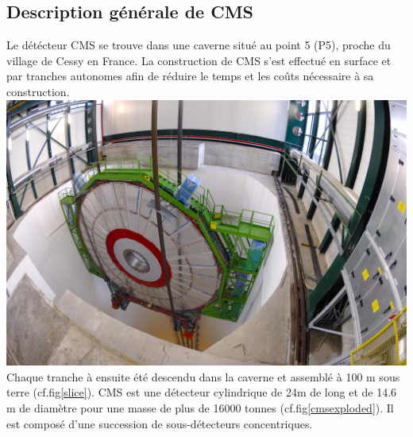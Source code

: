 \subsection{Description générale de CMS}
Le détécteur CMS se trouve dans une caverne situé au point 5 (P5), proche du village de Cessy en France. La construction de CMS s'est effectué en surface et par tranches autonomes afin de réduire le temps et les coûts nécessaire à sa construction.
\marginpar
{
	\centering
	\includegraphics[width=\marginparwidth]{CMS/slice.jpg}
	\label{slice}
}
Chaque tranche à ensuite été descendu dans la caverne et assemblé à 100 m sous terre (cf.fig\ref{slice}).
CMS est une détecteur cylindrique de 24m de long et de 14.6 m de diamètre pour une masse de plus de 16000 tonnes (cf.fig\ref{cmsexploded}). Il est composé d'une succession de sous-détecteurs concentriques.

